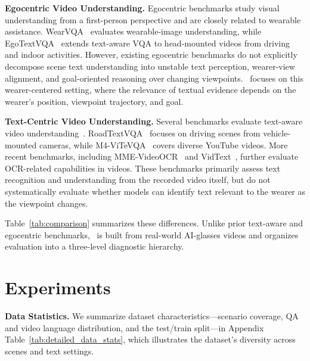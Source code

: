 \documentclass[11pt]{article}
\theoremstyle{plain}
\theoremstyle{definition}
\theoremstyle{remark}
\begin{document}
\noindent\textbf{Egocentric Video Understanding.}
Egocentric benchmarks study visual understanding from a first-person perspective and are closely related to wearable assistance.
WearVQA~\cite{chang2025wearvqa} evaluates wearable-image understanding, while EgoTextVQA~\cite{zhou2025egotextvqa} extends text-aware VQA to head-mounted videos from driving and indoor activities.
However, existing egocentric benchmarks do not explicitly decompose scene text understanding into unstable text perception, wearer-view alignment, and goal-oriented reasoning over changing viewpoints.
\dataset~focuses on this wearer-centered setting, where the relevance of textual evidence depends on the wearer's position, viewpoint trajectory, and goal.

\noindent\textbf{Text-Centric Video Understanding.}
Several benchmarks evaluate text-aware video understanding~\cite{zhao2022towards,wu2021bilingual,reddy2020roadtext,zhou2025egotextvqa,wu2023icdar}.
RoadTextVQA~\cite{reddy2020roadtext} focuses on driving scenes from vehicle-mounted cameras, while M4-ViTeVQA~\cite{zhao2022towards} covers diverse YouTube videos.
More recent benchmarks, including MME-VideoOCR~\cite{shi2025mmevideoocr} and VidText~\cite{yang2025vidtext}, further evaluate OCR-related capabilities in videos.
These benchmarks primarily assess text recognition and understanding from the recorded video itself, but do not systematically evaluate whether models can identify text relevant to the wearer as the viewpoint changes.

Table~\ref{tab:comparison} summarizes these differences.
Unlike prior text-aware and egocentric benchmarks, \dataset~is built from real-world AI-glasses videos and organizes evaluation into a three-level diagnostic hierarchy.






\section{Experiments}

\noindent\textbf{Data Statistics.}
We summarize dataset characteristics---scenario coverage, QA and video language distribution, and the test/train split---in Appendix Table~\ref{tab:detailed_data_stats}, which illustrates the dataset's diversity across scenes and text settings.
\end{document}
